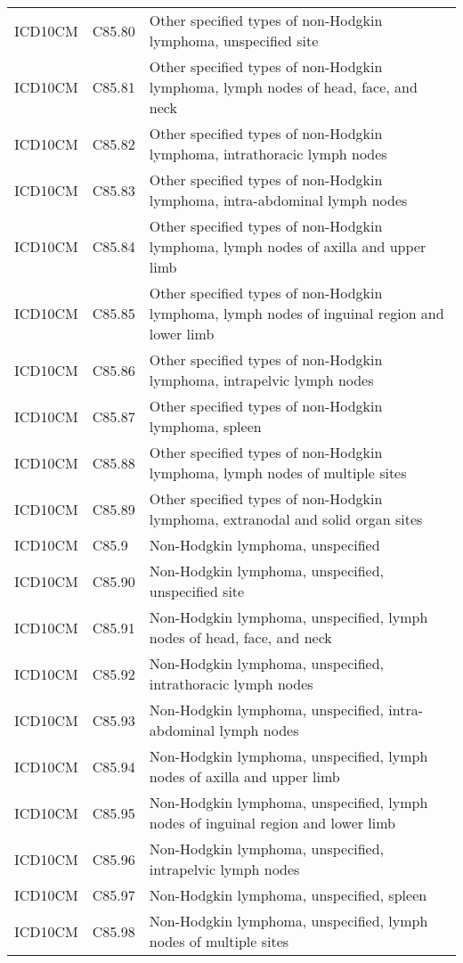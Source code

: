 \begin{longtable}{p{}p{}p{}}
  ICD10CM & C85.80 & Other specified types of non-Hodgkin lymphoma, unspecified site \\ 
  ICD10CM & C85.81 & Other specified types of non-Hodgkin lymphoma, lymph nodes of head, face, and neck \\ 
  ICD10CM & C85.82 & Other specified types of non-Hodgkin lymphoma, intrathoracic lymph nodes \\ 
  ICD10CM & C85.83 & Other specified types of non-Hodgkin lymphoma, intra-abdominal lymph nodes \\ 
  ICD10CM & C85.84 & Other specified types of non-Hodgkin lymphoma, lymph nodes of axilla and upper limb \\ 
  ICD10CM & C85.85 & Other specified types of non-Hodgkin lymphoma, lymph nodes of inguinal region and lower limb \\ 
  ICD10CM & C85.86 & Other specified types of non-Hodgkin lymphoma, intrapelvic lymph nodes \\ 
  ICD10CM & C85.87 & Other specified types of non-Hodgkin lymphoma, spleen \\ 
  ICD10CM & C85.88 & Other specified types of non-Hodgkin lymphoma, lymph nodes of multiple sites \\ 
  ICD10CM & C85.89 & Other specified types of non-Hodgkin lymphoma, extranodal and solid organ sites \\ 
  ICD10CM & C85.9 & Non-Hodgkin lymphoma, unspecified \\ 
  ICD10CM & C85.90 & Non-Hodgkin lymphoma, unspecified, unspecified site \\ 
  ICD10CM & C85.91 & Non-Hodgkin lymphoma, unspecified, lymph nodes of head, face, and neck \\ 
  ICD10CM & C85.92 & Non-Hodgkin lymphoma, unspecified, intrathoracic lymph nodes \\ 
  ICD10CM & C85.93 & Non-Hodgkin lymphoma, unspecified, intra-abdominal lymph nodes \\ 
  ICD10CM & C85.94 & Non-Hodgkin lymphoma, unspecified, lymph nodes of axilla and upper limb \\ 
  ICD10CM & C85.95 & Non-Hodgkin lymphoma, unspecified, lymph nodes of inguinal region and lower limb \\ 
  ICD10CM & C85.96 & Non-Hodgkin lymphoma, unspecified, intrapelvic lymph nodes \\ 
  ICD10CM & C85.97 & Non-Hodgkin lymphoma, unspecified, spleen \\ 
  ICD10CM & C85.98 & Non-Hodgkin lymphoma, unspecified, lymph nodes of multiple sites \\ 

\end{longtable}
